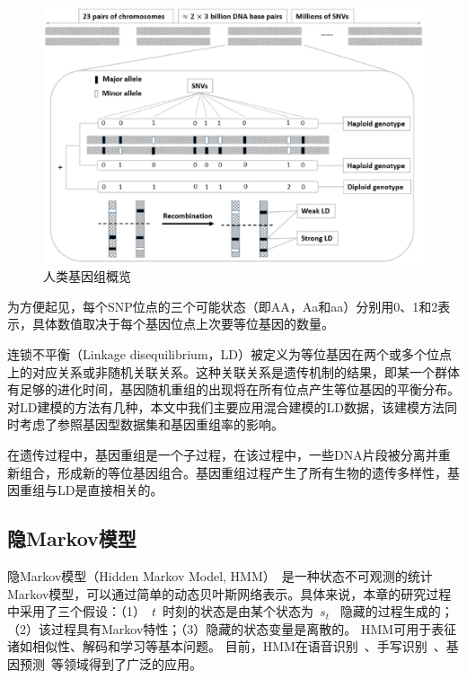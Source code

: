 \begin{figure}[htbp]
	\centering
	\includegraphics[width = 0.9\linewidth]{./figures/Fig1-human-genomic-overview.eps}
	\caption{人类基因组概览~\cite{samani2015quantifying}
	}
	\label{fig:human-genomic-overview}
\end{figure}

为方便起见，每个SNP位点的三个可能状态（即AA，Aa和aa）分别用0、1和2表示，具体数值取决于每个基因位点上次要等位基因的数量。

连锁不平衡（Linkage disequilibrium，LD）被定义为等位基因在两个或多个位点上的对应关系或非随机关联关系。这种关联关系是遗传机制的结果，即某一个群体有足够的进化时间，基因随机重组的出现将在所有位点产生等位基因的平衡分布。对LD建模的方法有几种，本文中我们主要应用混合建模的LD数据，该建模方法同时考虑了参照基因型数据集和基因重组率的影响。

在遗传过程中，基因重组是一个子过程，在该过程中，一些DNA片段被分离并重新组合，形成新的等位基因组合。基因重组过程产生了所有生物的遗传多样性，基因重组与LD是直接相关的。

\subsection{隐Markov模型}

隐Markov模型（Hidden Markov Model, HMM）~\cite{rabiner1989tutorial,stamp2004revealing}是一种状态不可观测的统计Markov模型，可以通过简单的动态贝叶斯网络表示。具体来说，本章的研究过程中采用了三个假设：（1）~$t$~时刻的状态是由某个状态为~$s_t$~ 隐藏的过程生成的；（2）该过程具有Markov特性；（3）隐藏的状态变量是离散的。
HMM可用于表征诸如相似性、解码和学习等基本问题。 目前，HMM在语音识别~\cite{rabiner1989tutorial}、手写识别~\cite{hu1996hmm}、基因预测~\cite{durbin1998biological}等领域得到了广泛的应用。

